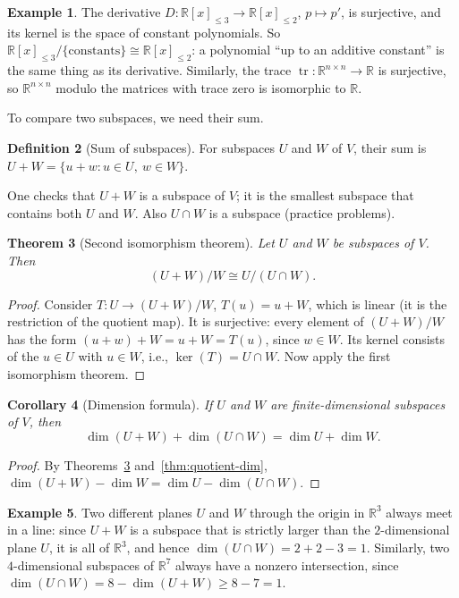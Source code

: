 \documentclass[11pt]{article}
\theoremstyle{definition}
\newtheorem{definition}{Definition}[section]
\newtheorem{example}[definition]{Example}
\theoremstyle{plain}
\newtheorem{theorem}[definition]{Theorem}
\newtheorem{corollary}[definition]{Corollary}
\theoremstyle{remark}
\DeclareMathOperator{\tr}{tr}
\begin{document}
\begin{example}
    The derivative $D: \mathbb{R}[x]_{\leq 3} \to \mathbb{R}[x]_{\leq 2}$, $p \mapsto p'$, is surjective, and its kernel is the space of constant polynomials. So $\mathbb{R}[x]_{\leq 3}/\{\text{constants}\} \cong \mathbb{R}[x]_{\leq 2}$: a polynomial ``up to an additive constant'' is the same thing as its derivative. Similarly, the trace $\tr: \mathbb{R}^{n \times n} \to \mathbb{R}$ is surjective, so $\mathbb{R}^{n \times n}$ modulo the matrices with trace zero is isomorphic to $\mathbb{R}$.
\end{example}

To compare two subspaces, we need their sum.

\begin{definition}[Sum of subspaces]
    For subspaces $U$ and $W$ of $V$, their sum is $U + W = \{u + w : u \in U, \ w \in W\}$.
\end{definition}

One checks that $U + W$ is a subspace of $V$; it is the smallest subspace that contains both $U$ and $W$. Also $U \cap W$ is a subspace (practice problems).

\begin{theorem}[Second isomorphism theorem]\label{thm:second-iso}
    Let $U$ and $W$ be subspaces of $V$. Then
    \[(U + W)/W \cong U/(U \cap W).\]
\end{theorem}

\begin{proof}
    Consider $T: U \to (U + W)/W$, $T(u) = u + W$, which is linear (it is the restriction of the quotient map). It is surjective: every element of $(U + W)/W$ has the form $(u + w) + W = u + W = T(u)$, since $w \in W$. Its kernel consists of the $u \in U$ with $u \in W$, i.e., $\ker(T) = U \cap W$. Now apply the first isomorphism theorem.
\end{proof}

\begin{corollary}[Dimension formula]\label{cor:grassmann}
    If $U$ and $W$ are finite-dimensional subspaces of $V$, then
    \[\dim(U + W) + \dim(U \cap W) = \dim U + \dim W.\]
\end{corollary}

\begin{proof}
    By Theorems~\ref{thm:second-iso} and~\ref{thm:quotient-dim}, $\dim(U + W) - \dim W = \dim U - \dim(U \cap W)$.
\end{proof}

\begin{example}
    Two different planes $U$ and $W$ through the origin in $\mathbb{R}^3$ always meet in a line: since $U + W$ is a subspace that is strictly larger than the $2$-dimensional plane $U$, it is all of $\mathbb{R}^3$, and hence $\dim(U \cap W) = 2 + 2 - 3 = 1$. Similarly, two $4$-dimensional subspaces of $\mathbb{R}^7$ always have a nonzero intersection, since $\dim(U \cap W) = 8 - \dim(U + W) \geq 8 - 7 = 1$.
\end{example}
\end{document}
